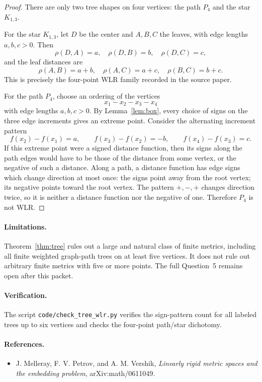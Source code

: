 \documentclass[11pt]{article}
\theoremstyle{remark}
\begin{document}
\begin{proof}
There are only two tree shapes on four vertices: the path \(P_4\) and the
star \(K_{1,3}\).

For the star \(K_{1,3}\), let \(D\) be the center and \(A,B,C\) the leaves,
with edge lengths \(a,b,c>0\).  Then
\[
  \rho(D,A)=a,\quad \rho(D,B)=b,\quad \rho(D,C)=c,
\]
and the leaf distances are
\[
  \rho(A,B)=a+b,\quad \rho(A,C)=a+c,\quad \rho(B,C)=b+c.
\]
This is precisely the four-point WLR family recorded in the source paper.

For the path \(P_4\), choose an ordering of the vertices
\[
  x_1-x_2-x_3-x_4
\]
with edge lengths \(a,b,c>0\).  By Lemma~\ref{lem:box}, every choice of signs
on the three edge increments gives an extreme point.  Consider the alternating
increment pattern
\[
  f(x_2)-f(x_1)=a,\qquad
  f(x_3)-f(x_2)=-b,\qquad
  f(x_4)-f(x_3)=c.
\]
If this extreme point were a signed distance function, then its signs along
the path edges would have to be those of the distance from some vertex, or the
negative of such a distance.  Along a path, a distance function has edge signs
which change direction at most once: the signs point away from the root
vertex; its negative points toward the root vertex.  The pattern
\(+,-,+\) changes direction twice, so it is neither a distance function nor
the negative of one.  Therefore \(P_4\) is not WLR.
\end{proof}

\paragraph{Limitations.}
Theorem~\ref{thm:tree} rules out a large and natural class of finite metrics,
including all finite weighted graph-path trees on at least five vertices.  It
does not rule out arbitrary finite metrics with five or more points.  The full
Question~5 remains open after this packet.

\paragraph{Verification.}
The script \texttt{code/check\_tree\_wlr.py} verifies the sign-pattern count
for all labeled trees up to six vertices and checks the four-point path/star
dichotomy.

\paragraph{References.}
\begin{itemize}
\item J. Melleray, F. V. Petrov, and A. M. Vershik,
  \emph{Linearly rigid metric spaces and the embedding problem},
  arXiv:math/0611049.
\end{itemize}
\end{document}
